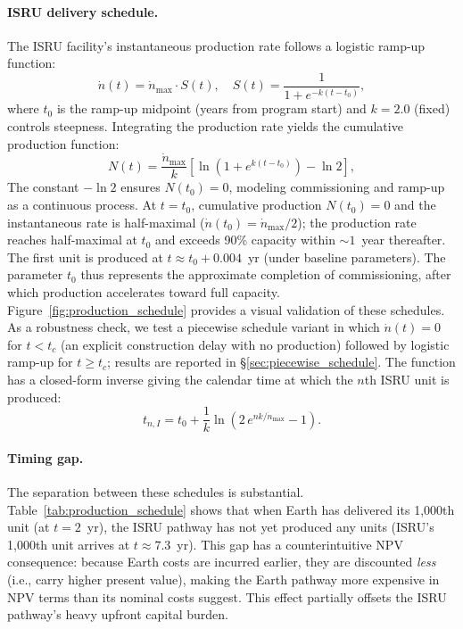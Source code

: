 \documentclass[preprint,12pt]{elsarticle}
\begin{document}
\paragraph{ISRU delivery schedule.} The ISRU facility's instantaneous production rate follows a logistic ramp-up function:
\begin{equation}
  \dot{n}(t) = \dot{n}_{\max} \cdot S(t), \quad S(t) = \frac{1}{1 + e^{-k(t - t_0)}},
  \label{eq:scurve}
\end{equation}
where $t_0$ is the ramp-up midpoint (years from program start) and $k = 2.0$ (fixed) controls steepness. Integrating the production rate yields the cumulative production function:
\begin{equation}
  N(t) = \frac{\dot{n}_{\max}}{k} \left[ \ln\!\left(1 + e^{k(t - t_0)}\right) - \ln 2 \right],
  \label{eq:cumulative_production}
\end{equation}
The constant $-\ln 2$ ensures $N(t_0) = 0$, modeling commissioning and ramp-up as a continuous process. At $t = t_0$, cumulative production $N(t_0) = 0$ and the instantaneous rate is half-maximal ($\dot{n}(t_0) = \dot{n}_{\max}/2$); the production rate reaches half-maximal at $t_0$ and exceeds 90\% capacity within ${\sim}1$~year thereafter. The first unit is produced at $t \approx t_0 + 0.004$~yr (under baseline parameters). The parameter $t_0$ thus represents the approximate completion of commissioning, after which production accelerates toward full capacity. Figure~\ref{fig:production_schedule} provides a visual validation of these schedules. As a robustness check, we test a piecewise schedule variant in which $\dot{n}(t) = 0$ for $t < t_c$ (an explicit construction delay with no production) followed by logistic ramp-up for $t \geq t_c$; results are reported in \S\ref{sec:piecewise_schedule}. The function has a closed-form inverse giving the calendar time at which the $n$th ISRU unit is produced:
\begin{equation}
  t_{n,I} = t_0 + \frac{1}{k} \ln\!\left(2\,e^{nk/\dot{n}_{\max}} - 1\right).
  \label{eq:production_schedule}
\end{equation}

\paragraph{Timing gap.} The separation between these schedules is substantial. Table~\ref{tab:production_schedule} shows that when Earth has delivered its 1{,}000th unit (at $t = 2$~yr), the ISRU pathway has not yet produced any units (ISRU's 1{,}000th unit arrives at $t \approx 7.3$~yr). This gap has a counterintuitive NPV consequence: because Earth costs are incurred earlier, they are discounted \emph{less} (i.e., carry higher present value), making the Earth pathway more expensive in NPV terms than its nominal costs suggest. This effect partially offsets the ISRU pathway's heavy upfront capital burden.
\end{document}
